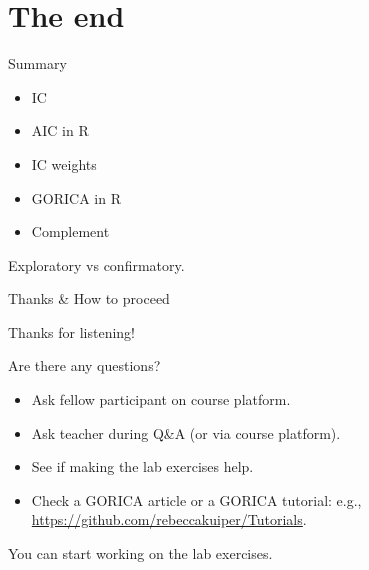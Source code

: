 \documentclass[10pt]{beamer}\usepackage[]{graphicx}\usepackage[]{xcolor}
\begin{document}
\section{The end}
%
%
\begin{frame}{Summary}

  \begin{itemize}
      \item IC
      \item AIC in R
      \item IC weights
      \item GORICA in R
      \item Complement
  \end{itemize}
  
  \vspace*{5mm}
  
  Exploratory vs confirmatory.

\end{frame}
%
\begin{frame}{Thanks \& How to proceed}

Thanks for listening!

\vspace*{5mm}

Are there any questions?\\
\begin{itemize}
  \item Ask fellow participant on course platform.
  \item Ask teacher during Q\&A (or via course platform).
  \item See if making the lab exercises help.
  \item Check a GORICA article or a GORICA tutorial: e.g., \url{https://github.com/rebeccakuiper/Tutorials}.
\end{itemize}

\vspace*{5mm}

You can start working on the lab exercises. %

\end{frame}
%
%
\end{document}
